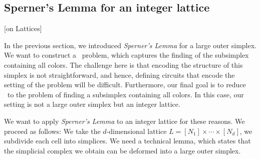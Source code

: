 \subsection{Sperner's Lemma for an integer lattice}[on Lattices]

In the previous section, we introduced \textit{Sperner's Lemma} for a large outer simplex. We want to construct a \TFNP\ problem, which captures the finding of the subsimplex containing all colors. The challenge here is that encoding the structure of this simplex is not straightforward, and hence, defining circuits that encode the setting of the problem will be difficult. Furthermore, our final goal is to reduce \Tarskistar\ to the problem of finding a subsimplex containing all colors. In this case, our setting is not a large outer simplex but an integer lattice.

We want to apply \textit{Sperner's Lemma} to an integer lattice for these reasons. We proceed as follows: We take the $d$-dimensional lattice $L = [N_1] \times \cdots \times [N_d]$, we subdivide each cell into simplices. We need a technical lemma, which states that the simplicial complex we obtain can be deformed into a large outer simplex.

